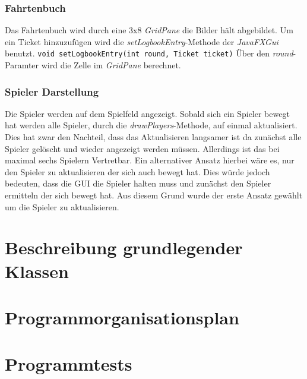             \subsubsection{Fahrtenbuch}
                Das Fahrtenbuch wird durch eine 3x8 \textit{GridPane} die Bilder hält abgebildet.
                Um ein Ticket hinzuzufügen wird die \textit{setLogbookEntry}-Methode der \textit{JavaFXGui} benutzt.
                \newline
                \newline
                \texttt{void setLogbookEntry(int round, Ticket ticket)}
                \newline
                \newline
                Über den \textit{round}-Paramter wird die Zelle im \textit{GridPane} berechnet.
            \subsubsection{Spieler Darstellung}
                Die Spieler werden auf dem Spielfeld angezeigt. Sobald sich ein Spieler bewegt hat werden alle Spieler, durch die \textit{drawPlayers}-Methode, auf einmal aktualisiert.
                Dies hat zwar den Nachteil, dass das Aktualisieren langsamer ist da zunächst alle Spieler gelöscht und wieder angezeigt werden müssen. Allerdings ist das bei maximal sechs Spielern Vertretbar.
                Ein alternativer Ansatz hierbei wäre es, nur den Spieler zu aktualisieren der sich auch bewegt hat. Dies würde jedoch bedeuten, dass die GUI die Spieler halten muss und zunächst den Spieler ermitteln der sich bewegt hat.
                Aus diesem Grund wurde der erste Ansatz gewählt um die Spieler zu aktualisieren.
 
    \newpage
    \section{Beschreibung grundlegender Klassen}
        
        \newpage
        
        \newpage
        
        \newpage
        
        \newpage
        
        \newpage
        
        \newpage
        
    \newpage
    \section{Programmorganisationsplan}
        
        \newpage
    \section{Programmtests}
        